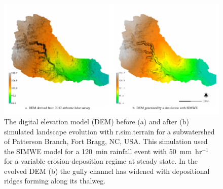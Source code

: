 \documentclass[gmd, manuscript]{copernicus}
\begin{document}


\begin{figure}%
\center
\includegraphics[width=\textwidth,height=0.925\textheight,keepaspectratio]{figures/evolution.pdf}
\caption{
The digital elevation model (DEM) 
before (a) and after (b)
simulated landscape evolution with r.sim.terrain 
for a subwatershed of Patterson Branch, Fort Bragg, NC, USA. 
This simulation used the SIMWE model
for a 120~\unit{min} rainfall event with 50~\unit{mm~hr}$^{-1}$
for a variable erosion-deposition regime at steady state.
In the evolved DEM (b)
the gully channel has widened 
with depositional ridges forming along its thalweg.}
\label{fig:evolution}
\end{figure}

\end{document}
